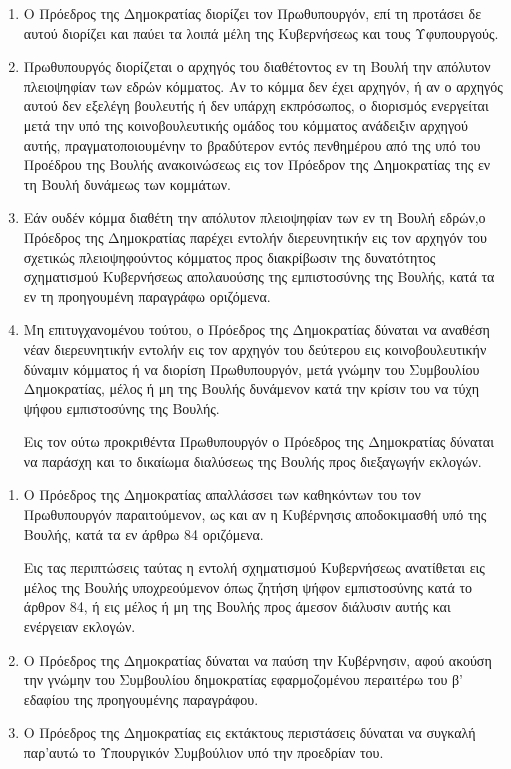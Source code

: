 \documentclass[twoside, a4paper, 10pt]{article}
\begin{document}
\begin{multicols}{2}
\begin{enumerate}
\begin{BigQuote}
\begin{enumerate}
  \item[1.] Ο Πρόεδρος της Δημοκρατίας διορίζει τον Πρωθυπουργόν, επί τη προτάσει δε αυτού διορίζει και παύει τα λοιπά μέλη της Κυβερνήσεως  και τους Υφυπουργούς.
  \item[2.] Πρωθυπουργός διορίζεται ο αρχηγός του διαθέτοντος εν τη Βουλή την απόλυτον πλειοψηφίαν των εδρών κόμματος. Αν το κόμμα δεν έχει αρχηγόν, ή αν ο αρχηγός αυτού δεν εξελέγη βουλευτής ή δεν υπάρχη εκπρόσωπος, ο διορισμός ενεργείται μετά την υπό της κοινοβουλευτικής ομάδος του κόμματος ανάδειξιν αρχηγού αυτής, πραγματοποιουμένην το βραδύτερον εντός πενθημέρου από της υπό του Προέδρου της Βουλής ανακοινώσεως εις τον Πρόεδρον της Δημοκρατίας της εν τη Βουλή δυνάμεως των κομμάτων.
  \item[3.] Εάν ουδέν κόμμα διαθέτη την απόλυτον πλειοψηφίαν των εν τη Βουλή εδρών,ο Πρόεδρος της Δημοκρατίας παρέχει εντολήν διερευνητικήν εις τον αρχηγόν  του σχετικώς πλειοψηφούντος κόμματος προς διακρίβωσιν της δυνατότητος σχηματισμού Κυβερνήσεως απολαυούσης της εμπιστοσύνης της Βουλής, κατά τα εν τη προηγουμένη παραγράφω οριζόμενα.
  \item[4.] Μη επιτυγχανομένου τούτου, ο Πρόεδρος της Δημοκρατίας δύναται να αναθέση νέαν διερευνητικήν  εντολήν εις τον αρχηγόν του δεύτερου εις κοινοβουλευτικήν δύναμιν κόμματος  ή να διορίση Πρωθυπουργόν, μετά γνώμην του Συμβουλίου Δημοκρατίας, μέλος ή μη της Βουλής δυνάμενον κατά την κρίσιν του  να τύχη ψήφου εμπιστοσύνης της Βουλής.

Εις τον ούτω προκριθέντα Πρωθυπουργόν ο Πρόεδρος της Δημοκρατίας δύναται να παράσχη και το δικαίωμα διαλύσεως της Βουλής προς διεξαγωγήν εκλογών.
\end{enumerate}

\begin{enumerate}
  \item[1.] Ο Πρόεδρος της Δημοκρατίας απαλλάσσει των καθηκόντων του τον Πρωθυπουργόν παραιτούμενον, ως και αν η Κυβέρνησις αποδοκιμασθή υπό της Βουλής, κατά τα εν άρθρω 84 οριζόμενα.

Εις τας περιπτώσεις ταύτας η εντολή σχηματισμού Κυβερνήσεως ανατίθεται εις μέλος της Βουλής υποχρεούμενον όπως ζητήση ψήφον εμπιστοσύνης κατά το άρθρον 84, ή εις μέλος  ή μη της Βουλής προς άμεσον διάλυσιν αυτής και ενέργειαν εκλογών.
  \item[2.] Ο Πρόεδρος της Δημοκρατίας δύναται να παύση την Κυβέρνησιν, αφού ακούση την γνώμην του Συμβουλίου δημοκρατίας εφαρμοζομένου περαιτέρω του β' εδαφίου της προηγουμένης παραγράφου.
  \item[3.] Ο Πρόεδρος της Δημοκρατίας εις εκτάκτους περιστάσεις δύναται να συγκαλή παρ'αυτώ το Υπουργικόν Συμβούλιον υπό την προεδρίαν του.
\end{enumerate}


\end{BigQuote}
\end{enumerate}
\end{multicols}
\end{document}
